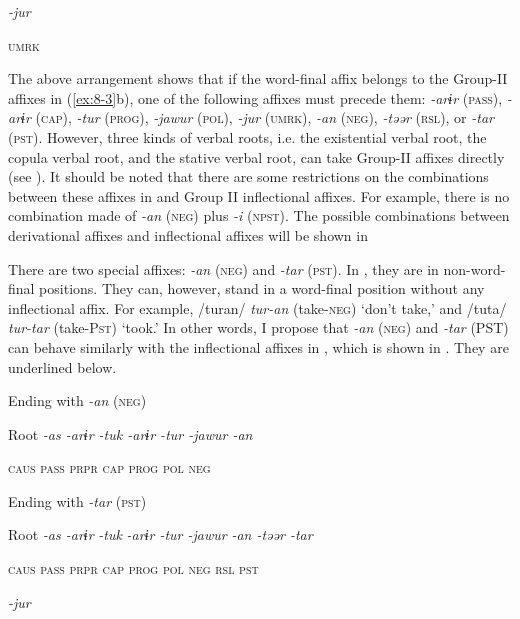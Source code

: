           \textit{-jur}

          \textsc{umrk}
\z

The above arrangement shows that if the word-final affix belongs to the Group-II affixes in (\ref{ex:8-3}b), one of the following affixes must precede them: \textit{-arɨr} (\textsc{pass}), \textit{-arɨr} (\textsc{cap}), \textit{-tur} (\textsc{prog}), \textit{-jawur} (\textsc{pol}), \textit{-jur} (\textsc{umrk}), \textit{-an} (\textsc{neg}), \textit{-təər} (\textsc{rsl}), or \textit{-tar} (\textsc{pst}). However, three kinds of verbal roots, i.e. the existential verbal root, the copula verbal root, and the stative verbal root, can take Group-II affixes directly (see ). It should be noted that there are some restrictions on the combinations between these affixes in  and Group II inflectional affixes. For example, there is no combination made of \textit{-an} (\textsc{neg}) plus \textit{-i} (\textsc{npst}). The possible combinations between derivational affixes and inflectional affixes will be shown in 

There are two special affixes: \textit{-an} (\textsc{neg}) and \textit{-tar} (\textsc{pst}). In , they are in non-word-final positions. They can, however, stand in a word-final position without any inflectional affix. For example, /turan/ \textit{tur-an} (take-\textsc{neg}) ‘don’t take,’ and /tuta/ \textit{tur-tar} (take-P\textsc{st}) ‘took.’ In other words, I propose that \textit{-an} (\textsc{neg}) and \textit{-tar} (PST) can behave similarly with the inflectional affixes in , which is shown in . They are underlined below.

\ea\label{ex:8-6}
\ea Ending with \textit{-an} (\textsc{neg})

    Root  \textit{-as  -arɨr  -tuk  -arɨr  -tur  -jawur  -an}

      \textsc{caus}  \textsc{pass}  \textsc{prpr}  \textsc{cap}  \textsc{prog}  \textsc{pol}  \textsc{neg}


\ex Ending with \textit{-tar} (\textsc{pst})

    Root  \textit{-as  -arɨr} %
\textit{-tuk}  \textit{-arɨr  -tur  -jawur} %
\textit{-an  -təər  -tar}

      \textsc{caus}  \textsc{pass}  \textsc{prpr}  \textsc{cap}  \textsc{prog}  \textsc{pol}  \textsc{neg}  \textsc{rsl}  \textsc{pst}

            \textit{-jur}

